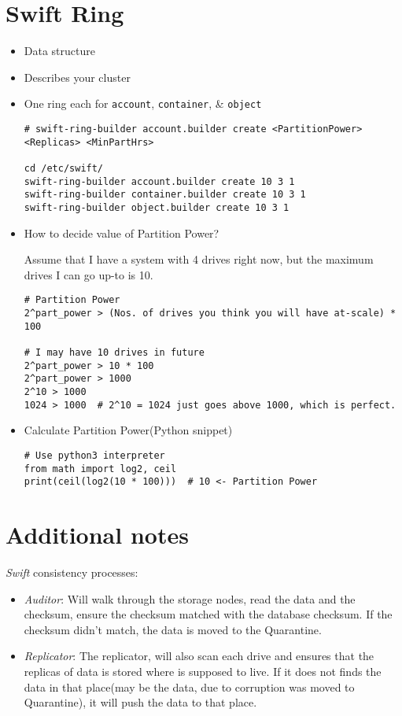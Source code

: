 \documentclass{article}
\begin{document}
\section{Swift Ring}
\label{sec:orgheadline4}
\begin{itemize}
\item Data structure
\item Describes your cluster
\item One ring each for \texttt{account}, \texttt{container}, \& \texttt{object}
\begin{verbatim}
# swift-ring-builder account.builder create <PartitionPower> <Replicas> <MinPartHrs>

cd /etc/swift/
swift-ring-builder account.builder create 10 3 1
swift-ring-builder container.builder create 10 3 1
swift-ring-builder object.builder create 10 3 1
\end{verbatim}

\item How to decide value of Partition Power?

Assume that I have a system with 4 drives right now, but the
maximum drives I can go up-to is 10.
\begin{verbatim}
# Partition Power
2^part_power > (Nos. of drives you think you will have at-scale) * 100

# I may have 10 drives in future
2^part_power > 10 * 100
2^part_power > 1000
2^10 > 1000
1024 > 1000  # 2^10 = 1024 just goes above 1000, which is perfect.
\end{verbatim}

\item Calculate Partition Power(Python snippet)
\begin{verbatim}
# Use python3 interpreter
from math import log2, ceil
print(ceil(log2(10 * 100)))  # 10 <- Partition Power
\end{verbatim}
\end{itemize}

\section{Additional notes}
\label{sec:orgheadline5}
\emph{Swift} consistency processes:
\begin{itemize}
\item \emph{Auditor}: Will walk through the storage nodes, read the data and
the checksum, ensure the checksum matched with the database
checksum. If the checksum didn't match, the data is moved to the
Quarantine.
\item \emph{Replicator}: The replicator, will also scan each drive and
ensures that the replicas of data is stored where is supposed to
live. If it does not finds the data in that place(may be the
data, due to corruption was moved to Quarantine), it will push
the data to that place.
\end{itemize}
\end{document}
